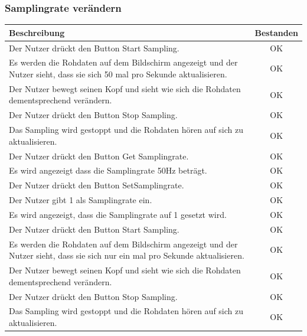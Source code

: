 \documentclass[a4paper,12pt]{article}
\newcommand{\testok}[0]{
	\cellcolor{green!25} OK
}
\begin{document}
\subsubsection{Samplingrate verändern}
\begin{tabular}{ | p{12cm} | c| }
	\hline
	\textbf{Beschreibung} & \textbf{Bestanden}\\
	\hline
	Der Nutzer drückt den Button \glqq{}Start Sampling\grqq{}. & \testok \\
	\hline
	Es werden die Rohdaten auf dem Bildschirm angezeigt und der Nutzer sieht, dass sie sich 50 mal pro Sekunde aktualisieren. & \testok \\
	\hline
	Der Nutzer bewegt seinen Kopf und sieht wie sich die Rohdaten dementsprechend verändern. & \testok \\
	\hline
	Der Nutzer drückt den Button \glqq{}Stop Sampling\grqq{}. & \testok \\
	\hline
	Das Sampling wird gestoppt und die Rohdaten hören auf sich zu aktualisieren. & \testok \\
	\hline
	Der Nutzer drückt den Button \glqq{}Get Samplingrate\grqq{}. & \testok \\
	\hline
	Es wird angezeigt dass die Samplingrate 50Hz beträgt. & \testok \\
	\hline
	Der Nutzer drückt den Button \glqq{}SetSamplingrate\grqq{}. & \testok \\
	\hline
	Der Nutzer gibt 1 als Samplingrate ein. & \testok \\
	\hline
	Es wird angezeigt, dass die Samplingrate auf 1 gesetzt wird. & \testok \\
	\hline
	Der Nutzer drückt den Button \glqq{}Start Sampling\grqq{}. & \testok \\
	\hline
	Es werden die Rohdaten auf dem Bildschirm angezeigt und der Nutzer sieht, dass sie sich nur ein mal pro Sekunde aktualisieren. & \testok \\
	\hline
	Der Nutzer bewegt seinen Kopf und sieht wie sich die Rohdaten dementsprechend verändern. & \testok \\
	\hline
	Der Nutzer drückt den Button \glqq{}Stop Sampling\grqq{}. & \testok \\
	\hline
	Das Sampling wird gestoppt und die Rohdaten hören auf sich zu aktualisieren. & \testok \\
	\hline
\end{tabular}
\\ \\ \\ \\
\end{document}
